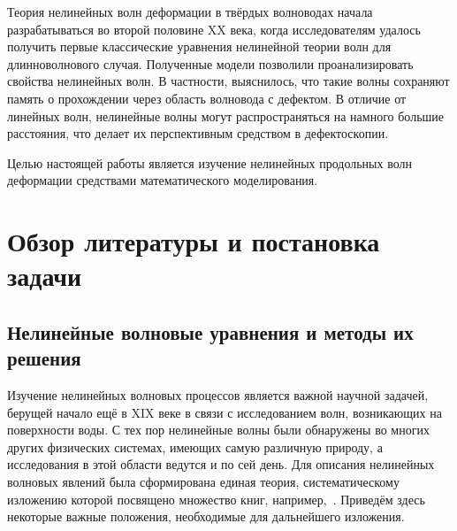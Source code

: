 \documentclass[12pt, a4paper]{report}
\begin{document}
Теория нелинейных волн деформации в твёрдых волноводах начала разрабатываться во второй половине XX века, когда исследователям удалось получить первые классические уравнения нелинейной теории волн для длинноволнового случая. Полученные модели позволили проанализировать свойства нелинейных волн. В частности, выяснилось, что такие волны сохраняют память о прохождении через область волновода с дефектом. В отличие от линейных волн, нелинейные волны могут распространяться на намного большие расстояния, что делает их перспективным средством в дефектоскопии. 

Целью настоящей работы является изучение нелинейных продольных волн деформации средствами математического моделирования.



\chapter{Обзор литературы и постановка задачи}

\section{Нелинейные волновые уравнения и методы их решения}
Изучение нелинейных волновых процессов является важной научной задачей, берущей начало ещё в XIX веке в связи с исследованием волн, возникающих на поверхности воды. С тех пор нелинейные волны были обнаружены во многих других физических системах, имеющих самую различную природу, а исследования в этой области ведутся и по сей день. Для описания нелинейных волновых явлений была сформирована единая теория, систематическому изложению которой посвящено множество книг, например,~\cite{Dodd,Ablowitz2011}. Приведём здесь некоторые важные положения, необходимые для дальнейшего изложения.
\end{document}
